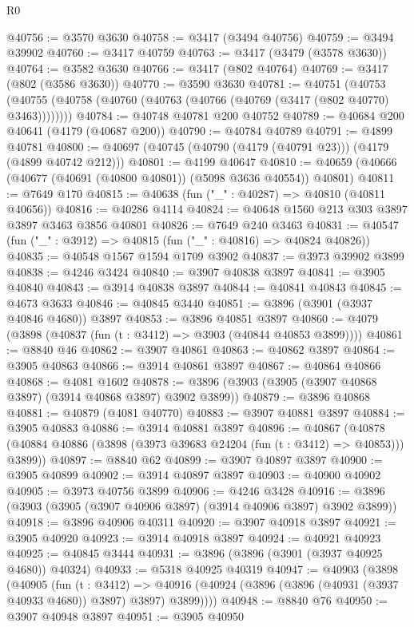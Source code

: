 \begin{lexlean}{R0}
\begin{coremodule}
@40756 := @3570 @3630
@40758 := @3417 (@3494 @40756)
@40759 := @3494 @39902
@40760 := @3417 @40759
@40763 := @3417 (@3479 (@3578 @3630))
@40764 := @3582 @3630
@40766 := @3417 (@802 @40764)
@40769 := @3417 (@802 (@3586 @3630))
@40770 := @3590 @3630
@40781 := @40751
    (@40753 (@40755 (@40758 (@40760 (@40763 (@40766 (@40769 (@3417 (@802 @40770) @3463))))))))
@40784 := @40748 @40781 @200 @40752
@40789 := @40684 @200 @40641 (@4179 (@40687 @200))
@40790 := @40784 @40789
@40791 := @4899 @40781
@40800 := @40697 (@40745 (@40790 (@4179 (@40791 @23))) (@4179 (@4899 @40742 @212)))
@40801 := @4199 @40647
@40810 := @40659 (@40666 (@40677 (@40691 (@40800 @40801)) (@5098 @3636 @40554)) @40801)
@40811 := @7649 @170
@40815 := @40638 (fun ("_" : @40287) => @40810 (@40811 @40656))
@40816 := @40286 @4114
@40824 := @40648 @1560 @213 @303 @3897 @3897 @3463 @3856 @40801
@40826 := @7649 @240 @3463
@40831 := @40547 (fun ("_" : @3912) => @40815 (fun ("_" : @40816) => @40824 @40826))
@40835 := @40548 @1567 @1594 @1709 @3902
@40837 := @3973 @39902 @3899
@40838 := @4246 @3424
@40840 := @3907 @40838 @3897
@40841 := @3905 @40840
@40843 := @3914 @40838 @3897
@40844 := @40841 @40843
@40845 := @4673 @3633
@40846 := @40845 @3440
@40851 := @3896 (@3901 (@3937 @40846 @4680)) @3897
@40853 := @3896 @40851 @3897
@40860 := @4079 (@3898 (@40837 (fun (t : @3412) => @3903 (@40844 @40853 @3899))))
@40861 := @8840 @46
@40862 := @3907 @40861
@40863 := @40862 @3897
@40864 := @3905 @40863
@40866 := @3914 @40861 @3897
@40867 := @40864 @40866
@40868 := @4081 @1602
@40878 := @3896 (@3903 (@3905 (@3907 @40868 @3897) (@3914 @40868 @3897) @3902 @3899))
@40879 := @3896 @40868
@40881 := @40879 (@4081 @40770)
@40883 := @3907 @40881 @3897
@40884 := @3905 @40883
@40886 := @3914 @40881 @3897
@40896 := @40867
    (@40878 (@40884 @40886 (@3898 (@3973 @39683 @24204 (fun (t : @3412) => @40853))) @3899))
@40897 := @8840 @62
@40899 := @3907 @40897 @3897
@40900 := @3905 @40899
@40902 := @3914 @40897 @3897
@40903 := @40900 @40902
@40905 := @3973 @40756 @3899
@40906 := @4246 @3428
@40916 := @3896 (@3903 (@3905 (@3907 @40906 @3897) (@3914 @40906 @3897) @3902 @3899))
@40918 := @3896 @40906 @40311
@40920 := @3907 @40918 @3897
@40921 := @3905 @40920
@40923 := @3914 @40918 @3897
@40924 := @40921 @40923
@40925 := @40845 @3444
@40931 := @3896 (@3896 (@3901 (@3937 @40925 @4680)) @40324)
@40933 := @5318 @40925 @40319
@40947 := @40903
    (@3898
      (@40905
        (fun (t : @3412) =>
        @40916 (@40924 (@3896 (@3896 (@40931 (@3937 @40933 @4680)) @3897) @3897) @3899))))
@40948 := @8840 @76
@40950 := @3907 @40948 @3897
@40951 := @3905 @40950

\end{coremodule}
\end{lexlean}
